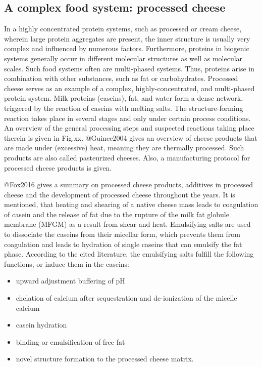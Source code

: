\documentclass[
]{article}
\providecommand{\tightlist}{%
  \setlength{\itemsep}{0pt}\setlength{\parskip}{0pt}}
\begin{document}
\subsection{A complex food system: processed cheese}

In a highly concentrated protein systems, such as processed or cream
cheese, wherein large protein aggregates are present, the inner
structure is usually very complex and influenced by numerous factors.
Furthermore, proteins in biogenic systems generally occur in different
molecular structures as well as molecular scales. Such food systems
often are multi-phased systems. Thus, proteins arise in combination with
other substances, such as fat or carbohydrates. Processed cheese serves
as an example of a complex, highly-concentrated, and multi-phased
protein system. Milk proteins (caseins), fat, and water form a dense
network, triggered by the reaction of caseins with melting salts. The
structure-forming reaction takes place in several stages and only under
certain process conditions. An overview of the general processing steps
and suspected reactions taking place therein is given in Fig.xx.
@Guinee2004 gives an overview of cheese products that are made under
(excessive) heat, meaning they are thermally processed. Such products
are also called pasteurized cheeses. Also, a manufacturing protocol for
processed cheese products is given.

@Fox2016 gives a summary on processed cheese products, additives in
processed cheese and the development of processed cheese throughout the
years. It is mentioned, that heating and shearing of a native cheese
mass leads to coagulation of casein and the release of fat due to the
rupture of the milk fat globule membrane (MFGM) as a result from shear
and heat. Emulsifying salts are used to dissociate the caseins from
their micellar form, which prevents them from coagulation and leads to
hydration of single caseins that can emulsify the fat phase. According
to the cited literature, the emulsifying salts fulfill the following
functions, or induce them in the caseins:

\begin{itemize}
\tightlist
\item
  upward adjustment buffering of pH
\item
  chelation of calcium after sequestration and de-ionization of the
  micelle calcium
\item
  casein hydration
\item
  binding or emulsification of free fat
\item
  novel structure formation to the processed cheese matrix.
\end{itemize}
\end{document}
